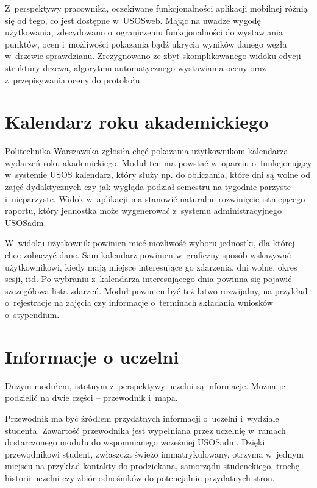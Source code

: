 \documentclass{pracamgr}
\begin{document}
Z~perspektywy pracownika, oczekiwane funkcjonalności aplikacji mobilnej różnią się od tego,
co jest dostępne w~USOSweb. Mając na uwadze wygodę użytkowania, zdecydowano
o~ograniczeniu funkcjonalności do wystawiania punktów, ocen i~możliwości pokazania bądź
ukrycia wyników danego węzła w~drzewie sprawdzianu. Zrezygnowano ze zbyt skomplikowanego
widoku edycji struktury drzewa, algorytmu automatycznego wystawiania oceny oraz z~przepisywania
oceny do protokołu.

\section{Kalendarz roku akademickiego}

Politechnika Warszawska zgłosiła chęć pokazania użytkownikom kalendarza wydarzeń
roku akademickiego. Moduł ten ma powstać w~oparciu o~funkcjonujący w~systemie USOS
kalendarz, który służy np. do obliczania, które dni są wolne od zajęć dydaktycznych
czy jak wygląda podział semestru na tygodnie parzyste i~nieparzyste. Widok w~aplikacji
ma stanowić naturalne rozwinięcie istniejącego raportu, który jednostka może wygenerować
z~systemu administracyjnego USOSadm.

W~widoku użytkownik powinien mieć możliwość wyboru jednostki, dla której chce zobaczyć
dane. Sam kalendarz powinien w~graficzny sposób wskazywać użytkownikowi, kiedy mają miejsce 
interesujące go zdarzenia, dni wolne, okres sesji, itd. 
Po wybraniu z~kalendarza interesującego dnia powinna się pojawić szczegółowa lista zdarzeń.
Moduł powinien być też łatwo rozwijalny, na przykład o~rejestracje na zajęcia czy informacje
o~terminach składania wniosków o~stypendium.

\section{Informacje o uczelni}

Dużym modułem, istotnym z~perspektywy uczelni są informacje. Można je
podzielić na dwie części -- przewodnik i~mapa.

Przewodnik ma być źródłem przydatnych informacji o~uczelni i~wydziale studenta. 
Zawartość przewodnika jest
wypełniana przez uczelnię w~ramach dostarczonego modułu do wspomnianego wcześniej
USOSadm. Dzięki przewodnikowi student, zwłaszcza świeżo immatrykulowany, otrzyma w~jednym
miejscu na przykład kontakty do prodziekana, samorządu studenckiego, trochę historii
uczelni czy zbiór odnośników do potencjalnie przydatnych stron.
\end{document}
